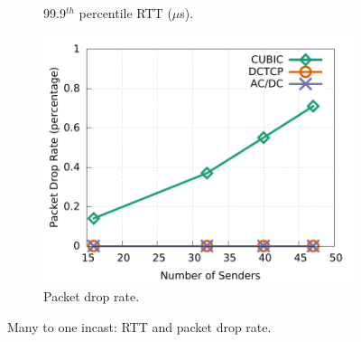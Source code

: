 \begin{figure}[!t]
\begin{subfigure}[b]{0.33\textwidth}
                \caption{99.9$^{th}$ percentile RTT ($\mu$s).}
                \label{incast_9k_999th_sockperf}
        \end{subfigure}
        \begin{subfigure}[b]{0.33\textwidth}
                \centering
                \includegraphics[width=\textwidth]{figures/incast/plots9k/incast_droprate_vary_sender.pdf}
                \caption{Packet drop rate.}
                \label{incast_9k_droprate}
        \end{subfigure}
	\caption{Many to one incast: RTT and packet drop rate.}
	\label{incast_9k_sockperf_droprate}
\end{figure}

